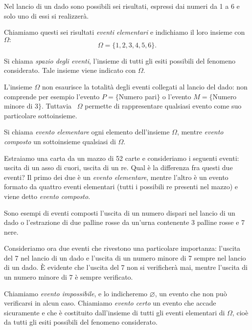 Nel lancio di un dado sono possibili sei risultati, espressi dai numeri da 1 a 
6 
e solo uno di essi si realizzerà.

Chiamiamo questi sei risultati \emph{eventi elementari} e indichiamo il loro 
insieme con 
$\Omega:$ 
\[\Omega =\{1,2,3,4,5,6\}.\]

\begin{definizione}
Si chiama \emph{spazio degli eventi}, l'insieme di tutti gli esiti possibili 
del 
fenomeno considerato. Tale insieme viene indicato con $\Omega $.
\end{definizione}

L'insieme $\Omega $ non esaurisce la totalità degli eventi collegati al lancio 
del dado: non comprende per esempio l'evento $P=\{$Numero pari$\}$ o l'evento $M=\{$Numero
minore di $3\}$. Tuttavia~ $\Omega $ permette di rappresentare qualsiasi 
evento come suo particolare sottoinsieme.

\begin{definizione}
Si chiama \emph{evento elementare} ogni elemento dell'insieme $\Omega$, mentre 
\emph{evento composto} un sottoinsieme qualsiasi di $\Omega$.
\end{definizione}

Estraiamo una carta da un mazzo di 52 carte e consideriamo i seguenti eventi: 
uscita di un asso di cuori, uscita di un re. Qual è la differenza fra questi 
due 
eventi? Il primo dei due è un \emph{evento elementare}, mentre l'altro è un 
evento formato da quattro eventi elementari (tutti i possibili re presenti nel 
mazzo) e viene detto \emph{evento composto}.

Sono esempi di eventi composti l'uscita di un numero dispari nel lancio di un 
dado o l'estrazione di due palline rosse da un'urna contenente 3 palline rosse 
e 
7 nere.

Consideriamo ora due eventi che rivestono una particolare importanza: l'uscita 
del 7 nel lancio di un dado e l'uscita di un numero minore di 7 sempre nel 
lancio di un dado. È evidente che l'uscita del 7 non si verificherà mai, mentre 
l'uscita di un numero minore di 7 è sempre verificato.

\begin{definizione}
Chiamiamo \emph{evento impossibile}, e lo indicheremo $\varnothing$, un evento 
che non può verificarsi in alcun caso.
Chiamiamo \emph{evento certo} un evento che accade sicuramente e che è 
costituito dall'insieme di tutti gli eventi elementari di $\Omega $, cioè da 
tutti gli esiti possibili del fenomeno considerato.
\end{definizione}

